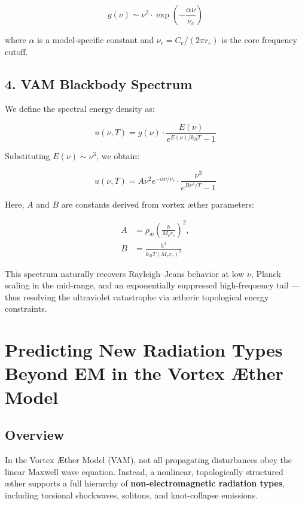 \documentclass[12pt]{article}
\begin{document}
\begin{equation}
g(\nu) \sim \nu^2 \cdot \exp\left(-\frac{\alpha \nu}{\nu_c}\right)
\end{equation}

where \( \alpha \) is a model-specific constant and \( \nu_c = C_e / (2\pi r_c) \) is the core frequency cutoff.

\subsection*{4. VAM Blackbody Spectrum}

We define the spectral energy density as:

\begin{equation}
u(\nu, T) = g(\nu) \cdot \frac{E(\nu)}{e^{E(\nu)/k_B T} - 1}
\end{equation}

Substituting \( E(\nu) \sim \nu^3 \), we obtain:

\begin{equation}
\boxed{
u(\nu, T) = A \nu^2 e^{-\alpha \nu/\nu_c} \cdot
\frac{\nu^3}{e^{B \nu^3 / T} - 1}
}
\end{equation}

Here, \( A \) and \( B \) are constants derived from vortex æther parameters:

\begin{align}
A &= \rho_\text{\ae} \left( \frac{h}{M_e r_c} \right)^2, \\
B &= \frac{h^3}{k_B T \left(M_e r_c\right)^2}
\end{align}

This spectrum naturally recovers Rayleigh–Jeans behavior at low \( \nu \), Planck scaling in the mid-range, and an exponentially suppressed high-frequency tail — thus resolving the ultraviolet catastrophe via ætheric topological energy constraints.

\section{Predicting New Radiation Types Beyond EM in the Vortex Æther Model}

\subsection*{Overview}

In the Vortex Æther Model (VAM), not all propagating disturbances obey the linear Maxwell wave equation. Instead, a nonlinear, topologically structured æther supports a full hierarchy of \textbf{non-electromagnetic radiation types}, including torsional shockwaves, solitons, and knot-collapse emissions.
\end{document}
